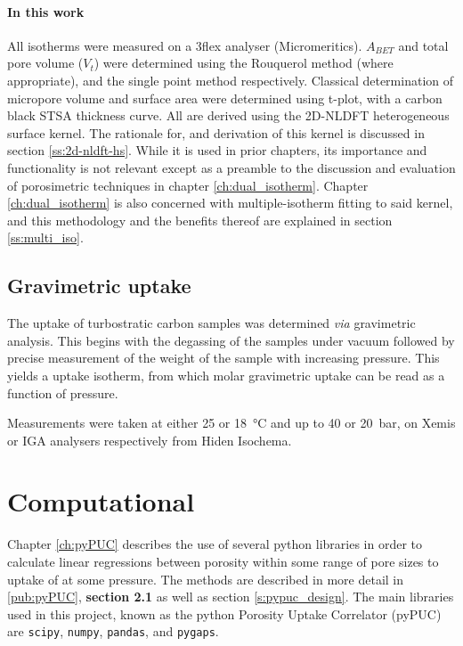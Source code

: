 \paragraph{In this work} All isotherms were measured on a 3flex analyser (Micromeritics). $A_{BET}$ and total pore volume ($V_t$) were determined using the Rouquerol method (where appropriate), and the single point method respectively. Classical determination of \gls{micropore} volume and surface area were determined using t-plot, with a carbon black STSA thickness curve. All  are derived using the 2D-NLDFT heterogeneous surface kernel.\citep{Jagiello20132D} The rationale for, and derivation of this kernel is discussed in section \ref{ss:2d-nldft-hs}. While it is used in prior chapters, its importance and functionality is not relevant except as a preamble to the discussion and evaluation of porosimetric techniques in chapter \ref{ch:dual_isotherm}. Chapter \ref{ch:dual_isotherm} is also concerned with multiple-isotherm fitting to said kernel, and this methodology and the benefits thereof are explained in section \ref{ss:multi_iso}.\citep{Jagiello2015Dual}

\subsection{\texorpdfstring{Gravimetric  uptake}{Gravimetric CO2 uptake}}
The  uptake of \gls{turbostratic carbon} samples was determined \textit{via} gravimetric analysis. This begins with the degassing of the samples under vacuum followed by precise measurement of the weight of the sample with increasing  pressure. This yields a  uptake isotherm, from which molar gravimetric uptake can be read as a function of pressure.

Measurements were taken at either \num{25} or \qty{18}{\degreeCelsius} and up to \num{40} or \qty{20}{\bar}, on Xemis or IGA analysers respectively from Hiden Isochema. 

\section{Computational}
Chapter \ref{ch:pyPUC} describes the use of several python libraries in order to calculate linear regressions between porosity within some range of pore sizes to uptake of  at some pressure. The methods are described in more detail in \ref{pub:pyPUC}, \textbf{section 2.1} as well as section \ref{s:pypuc_design}. The main libraries used in this project, known as the python Porosity Uptake Correlator (pyPUC) are \verb|scipy|,\citep{SciPy2020} \verb|numpy|,\citep{numpy2022} \verb|pandas|,\citep{pandas2010} and \verb|pygaps|.\citep{Iacomi2019pyGAPS}




